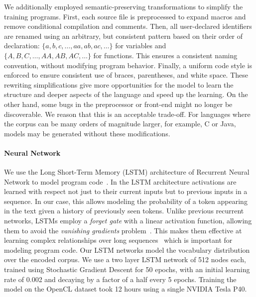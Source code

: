 We additionally employed semantic-preserving transformations to simplify the training programs. First, each source file is preprocessed to expand macros and remove conditional compilation and comments. Then, all user-declared identifiers are renamed using an arbitrary, but consistent pattern based on their order of declaration: $\{a,\allowbreak b,\allowbreak c,\allowbreak \ldots,\allowbreak aa,\allowbreak ab,\allowbreak ac,\allowbreak \ldots\}$ for variables and $\{A,\allowbreak B,\allowbreak C,\allowbreak \ldots,\allowbreak AA,\allowbreak AB,\allowbreak AC,\allowbreak \ldots\}$ for functions. This ensures a consistent naming convention, without modifying program behavior. Finally, a uniform code style is enforced to ensure consistent use of braces, parentheses, and white space. These rewriting simplifications give more opportunities for the model to learn the structure and deeper aspects of the language and speed up the learning. On the other hand, some bugs in the preprocessor or front-end might no longer be discoverable. We reason that this is an acceptable trade-off. For languages where the corpus can be many orders of magnitude larger, for example, C or Java, models may be generated without these modifications.

\paragraph{Neural Network} We use the Long Short-Term Memory (LSTM) architecture of Recurrent Neural Network to model program code~\cite{Hochreiter1997}. In the LSTM architecture activations are learned with respect not just to their current inputs but to previous inputs in a sequence. In our case, this allows modeling the probability of a token appearing in the text given a history of previously seen tokens. Unlike previous recurrent networks, LSTMs employ a \emph{forget gate} with a linear activation function, allowing them to avoid the \emph{vanishing gradients} problem~\cite{Pacanu2013}. This makes them effective at learning complex relationships over long sequences~\cite{Lipton2015} which is important for modeling program code. Our LSTM networks model the vocabulary distribution over the encoded corpus.  We use a two layer LSTM network of 512 nodes each, trained using Stochastic Gradient Descent for 50 epochs, with an initial learning rate of 0.002 and decaying by a factor of a half every 5 epochs. Training the model on the OpenCL dataset took 12 hours using a single NVIDIA Tesla P40.

